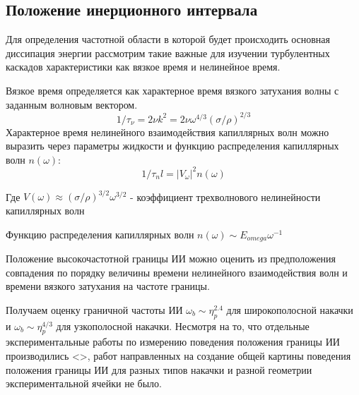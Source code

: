 
\subsection{Положение инерционного интервала} \label{subsect_boundary}

Для определения частотной области в которой будет происходить основная диссипация энергии рассмотрим такие важные для изучении турбулентных каскадов характеристики как вязкое время и нелинейное время.

Вязкое время определяется как характерное время вязкого затухания волны с заданным волновым вектором.
\begin{equation}
1/\tau_\nu = 2\nu k^2 = 2 \nu \omega^{4/3}(\sigma/\rho)^{2/3}
\end{equation}
Характерное время нелинейного взаимодействия капиллярных волн можно выразить через параметры жидкости и функцию распределения капиллярных волн $n(\omega)$:
\begin{equation}
1/\tau_nl = |V_\omega|^2 n(\omega)
\end{equation}

Где $V(\omega) \approx (\sigma/\rho)^{3/2}\omega^{3/2}$ - коэффициент трехволнового нелинейности капиллярных волн

Функцию распределения капиллярных волн $n(\omega) \sim E_{omega}\omega^{-1}$ 

Положение высокочастотной границы ИИ можно оценить из предположения совпадения по порядку величины времени нелинейного взаимодействия волн и времени вязкого затухания на частоте границы.

Получаем оценку граничной частоты ИИ $\omega_b \sim \eta_p^{2.4}$ для широкополосной накачки и $\omega_b \sim \eta_p^{4/3}$ для узкополосной накачки. Несмотря на то, что отдельные экспериментальные работы по измерению поведения положения границы ИИ производились <>, работ направленных на создание общей картины поведения положения границы ИИ для разных типов накачки и разной геометрии экспериментальной ячейки не было.


